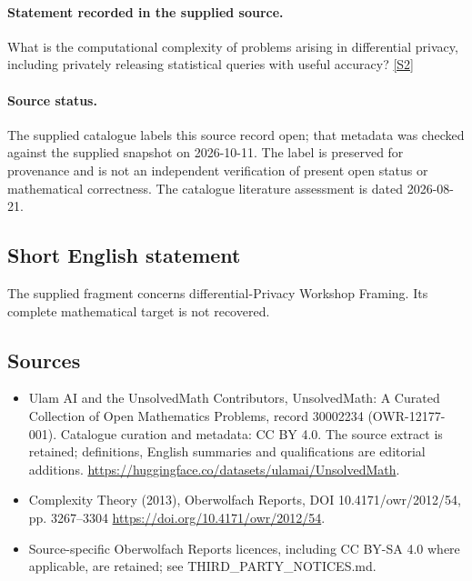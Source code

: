 \documentclass[11pt]{article}
\newcommand{\sref}[2]{\hyperlink{source:#1:#2}{[S#2]}}
\begin{document}
\paragraph{Statement recorded in the supplied source.}
What is the computational complexity of problems arising in differential privacy, including privately releasing statistical queries with useful accuracy? \sref{30002234}{2}
\paragraph{Source status.}
The supplied catalogue labels this source record open; that metadata was checked against the supplied snapshot on 2026-10-11. The label is preserved for provenance and is not an independent verification of present open status or mathematical correctness. The catalogue literature assessment is dated 2026-08-21.
\subsection{Short English statement}
The supplied fragment concerns differential-Privacy Workshop Framing. Its complete mathematical target is not recovered.
\subsection{Sources}
\begin{itemize}
\item[\hypertarget{source:30002234:1}{S1}] Ulam AI and the UnsolvedMath Contributors, UnsolvedMath: A Curated Collection of Open Mathematics Problems, record 30002234 (OWR-12177-001). Catalogue curation and metadata: CC BY 4.0. The source extract is retained; definitions, English summaries and qualifications are editorial additions.
\url{https://huggingface.co/datasets/ulamai/UnsolvedMath}.
\item[\hypertarget{source:30002234:2}{S2}] Complexity Theory (2013), Oberwolfach Reports, DOI 10.4171/owr/2012/54, pp. 3267--3304
\url{https://doi.org/10.4171/owr/2012/54}.
\item Source-specific Oberwolfach Reports licences, including CC BY-SA 4.0 where applicable, are retained; see THIRD\_PARTY\_NOTICES.md.
\end{itemize}
\end{document}
